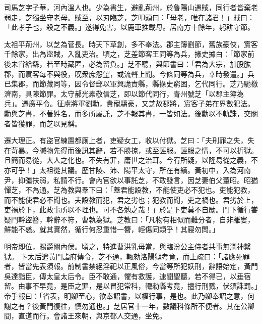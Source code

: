\begin{pinyinscope}
 
 
 司馬芝字子華，河內溫人也。少為書生，避亂荊州，於魯陽山遇賊，同行者皆棄老弱走，芝獨坐守老母。賊至，以刃臨芝，芝叩頭曰：「母老，唯在諸君！」賊曰：「此孝子也，殺之不義。」遂得免害，以鹿車推載母。居南方十餘年，躬耕守節。
 
 
 
 
 太祖平荊州，以芝為菅長。時天下草創，多不奉法。郡主簿劉節，舊族豪俠，賔客千餘家，出為盜賊，入亂吏治。頃之，芝差節客王同等為兵，掾史據白：「節家前後未甞給繇，若至時藏匿，必為留負。」芝不聽，與節書曰：「君為大宗，加股肱郡，而賔客每不與役，旣衆庶怨望，或流聲上聞。今條同等為兵，幸時發遣。」兵已集郡，而節藏同等，因令督郵以軍興詭責縣，縣掾史窮困，乞代同行。芝乃馳檄濟南，具陳節罪。太守郝光素敬信芝，即以節代同行，青州號芝「以郡主簿為兵」。遷廣平令。征虜將軍劉勳，貴寵驕豪，又芝故郡將，賔客子弟在界數犯法。勳與芝書，不著姓名，而多所屬託，芝不報其書，一皆如法。後勳以不軌誅，交關者皆獲罪，而芝以見稱。
 
 
 
 
 
 
 遷大理正。有盜官練置都厠上者，吏疑女工，收以付獄。芝曰：「夫刑罪之失，失在苛暴。今贓物先得而後訊其辭，若不勝掠，或至誣服。誣服之情，不可以折獄。且簡而易從，大人之化也。不失有罪，庸世之治耳。今宥所疑，以隆易從之義，不亦可乎！」太祖從其議。歷甘陵、沛、陽平太守，所在有績。黃初中，入為河南尹，抑彊扶弱，私請不行。會內官欲以事託芝，不敢發言，因芝妻伯父董昭。昭猶憚芝，不為通。芝為教與羣下曰：「蓋君能設教，不能使吏必不犯也。吏能犯教，而不能使君必不聞也。夫設教而犯，君之劣也；犯教而聞，吏之禍也。君劣於上，吏禍於下，此政事所以不理也。可不各勉之哉！」於是下吏莫不自勵。門下循行甞疑門幹盜簪，幹辭不符，曹執為獄。芝教曰：「凡物有相似而難分者，自非離婁，鮮能不惑。就其實然，循行何忍重惜一簪，輕傷同類乎！其寢勿問。」
 
 
明帝即位，賜爵關內侯。頃之，特進曹洪乳母當，與臨汾公主侍者共事無澗神繫獄。
 卞太后遣黃門詣府傳令，芝不通，輙勑洛陽獄考竟，而上疏曰：「諸應死罪者，皆當先表須報。前制書禁絕淫祀以正風俗，今當等所犯妖刑，辭語始定，黃門吳達詣臣，傳太皇太后令。臣不敢通，懼有救護，速聞聖聽，若不得已，以垂宿留。由事不早竟，是臣之罪，是以冒犯常科，輙勑縣考竟，擅行刑戮，伏須誅罰。」帝手報曰：「省表，明卿至心，欲奉詔書，以權行事，是也。此乃卿奉詔之意，何謝之有？後黃門復往，慎勿通也。」芝居官十一年，數議科條所不便者。其在公卿間，直道而行。會諸王來朝，與京都人交通，坐免。
 

\end{pinyinscope}
